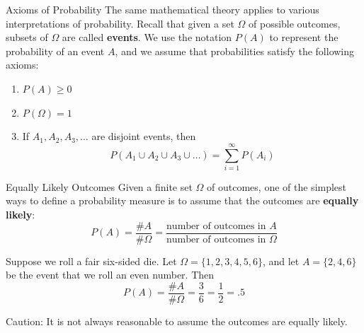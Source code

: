 \documentclass[xcolor=table]{beamer}
\renewcommand{\emph}{\textbf}
\begin{document}
\begin{frame}{Axioms of Probability}
The same mathematical theory applies to various interpretations of probability. Recall that given a set $\Omega$ of possible outcomes, subsets of $\Omega$ are called \emph{events}. We use the notation $P(A)$ to represent the probability of an event $A$, and we assume that probabilities satisfy the following axioms:
\begin{enumerate}
\item $P(A) \geq 0$
\item $P(\Omega)=1$
\item If $A_1, A_2,A_3,\dots$ are disjoint events, then
$$P(A_1\cup A_2\cup A_3\cup\dots) = \sum_{i=1}^\infty P(A_i)$$
\end{enumerate}
\end{frame}

\begin{frame}{Equally Likely Outcomes}
Given a finite set $\Omega$ of outcomes, one of the simplest ways to define a probability measure is to assume that the outcomes are \emph{equally likely}:
$$P(A) = \frac{\# A}{\# \Omega} = \frac{\text{number of outcomes in $A$}}{\text{number of outcomes in $\Omega$}}$$

\pause \begin{example}
Suppose we roll a fair six-sided die. Let $\Omega=\{1,2,3,4,5,6\}$, and let $A=\{2,4,6\}$ be the event that we roll an even number. Then
$$P(A)=\frac{\# A}{\#\Omega}=\frac36=\frac12=.5$$
\end{example}
\pause Caution: It is not always reasonable to assume the outcomes are equally likely. %
\end{frame}
\end{document}
